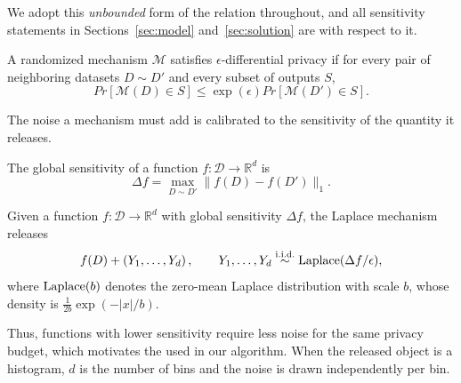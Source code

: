 We adopt this \emph{unbounded} form of the relation throughout, and all sensitivity
statements in Sections~\ref{sec:model} and~\ref{sec:solution} are with respect to
it.

\begin{definition}
A randomized mechanism $\mathcal{M}$ satisfies $\epsilon$-differential privacy if for
every pair of neighboring datasets $D\sim D'$ and every subset of outputs $S$,
\[
Pr[\mathcal{M}(D)\in S]
\leq
\exp(\epsilon)
Pr[\mathcal{M}(D')\in S].
\]
\end{definition}

The noise a mechanism must add is calibrated to the sensitivity of the quantity it
releases.

\begin{definition}
\label{def:global-sensitivity}
The global sensitivity of a function $f:\mathcal{D}\rightarrow\mathbb{R}^d$ is
\[
\Delta f
=
\max_{D\sim D'}
\|f(D)-f(D')\|_1 .
\]
\end{definition}

\begin{definition}
\label{def:laplace-mechanism}
Given a function $f:\mathcal{D}\rightarrow\mathbb{R}^d$ with global sensitivity
$\Delta f$, the Laplace mechanism releases
\[
f(D)+\left(Y_1,\ldots,Y_d\right),
\qquad
Y_1,\ldots,Y_d \stackrel{\text{i.i.d.}}{\sim} \operatorname{Laplace}(\Delta f/\epsilon),
\]
where $\operatorname{Laplace}(b)$ denotes the zero-mean Laplace distribution with scale $b$, whose
density is $\frac{1}{2b}\exp(-|x|/b)$.
\end{definition}

Thus, functions with lower sensitivity require less noise for the same
privacy budget, which motivates the  used in
our algorithm.
When the released object is a histogram, $d$ is the number of bins and the noise is
drawn independently per bin.

